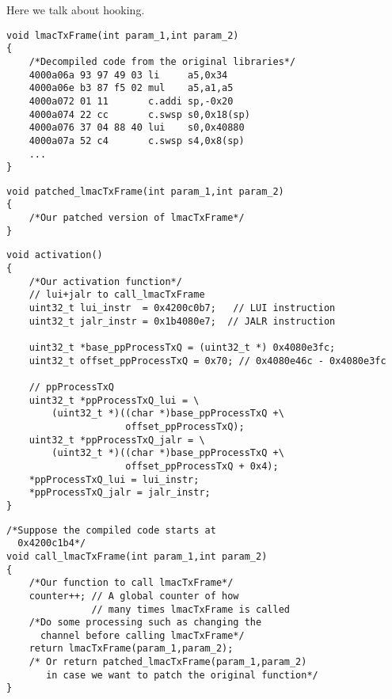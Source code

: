 Here we talk about hooking.


\newsavebox\funlmactxframe


\begin{lrbox}{\funlmactxframe}
\begin{lstlisting}
void lmacTxFrame(int param_1,int param_2)
{
    /*Decompiled code from the original libraries*/
    4000a06a 93 97 49 03 li     a5,0x34
    4000a06e b3 87 f5 02 mul    a5,a1,a5
    4000a072 01 11       c.addi sp,-0x20
    4000a074 22 cc       c.swsp s0,0x18(sp)
    4000a076 37 04 88 40 lui    s0,0x40880
    4000a07a 52 c4       c.swsp s4,0x8(sp)
    ...
}
\end{lstlisting}
\end{lrbox}

\newsavebox\funpatchlmactxframe
\begin{lrbox}{\funpatchlmactxframe}
\begin{lstlisting}
void patched_lmacTxFrame(int param_1,int param_2)
{
    /*Our patched version of lmacTxFrame*/
}
\end{lstlisting}
\end{lrbox}

\newsavebox\funactivation
\begin{lrbox}{\funactivation}
\begin{lstlisting}
void activation()
{
    /*Our activation function*/
    // lui+jalr to call_lmacTxFrame
    uint32_t lui_instr  = 0x4200c0b7;   // LUI instruction
    uint32_t jalr_instr = 0x1b4080e7;  // JALR instruction

    uint32_t *base_ppProcessTxQ = (uint32_t *) 0x4080e3fc;
    uint32_t offset_ppProcessTxQ = 0x70; // 0x4080e46c - 0x4080e3fc

    // ppProcessTxQ
    uint32_t *ppProcessTxQ_lui = \
        (uint32_t *)((char *)base_ppProcessTxQ +\
                     offset_ppProcessTxQ);
    uint32_t *ppProcessTxQ_jalr = \
        (uint32_t *)((char *)base_ppProcessTxQ +\
                     offset_ppProcessTxQ + 0x4);
    *ppProcessTxQ_lui = lui_instr;
    *ppProcessTxQ_jalr = jalr_instr;    
}
\end{lstlisting}
\end{lrbox}

\newsavebox\funcalllmactxframe
\begin{lrbox}{\funcalllmactxframe}
\begin{lstlisting}
/*Suppose the compiled code starts at 
  0x4200c1b4*/
void call_lmacTxFrame(int param_1,int param_2)
{
    /*Our function to call lmacTxFrame*/
    counter++; // A global counter of how 
               // many times lmacTxFrame is called
    /*Do some processing such as changing the
      channel before calling lmacTxFrame*/
    return lmacTxFrame(param_1,param_2);
    /* Or return patched_lmacTxFrame(param_1,param_2)
       in case we want to patch the original function*/
}
\end{lstlisting}
\end{lrbox}

